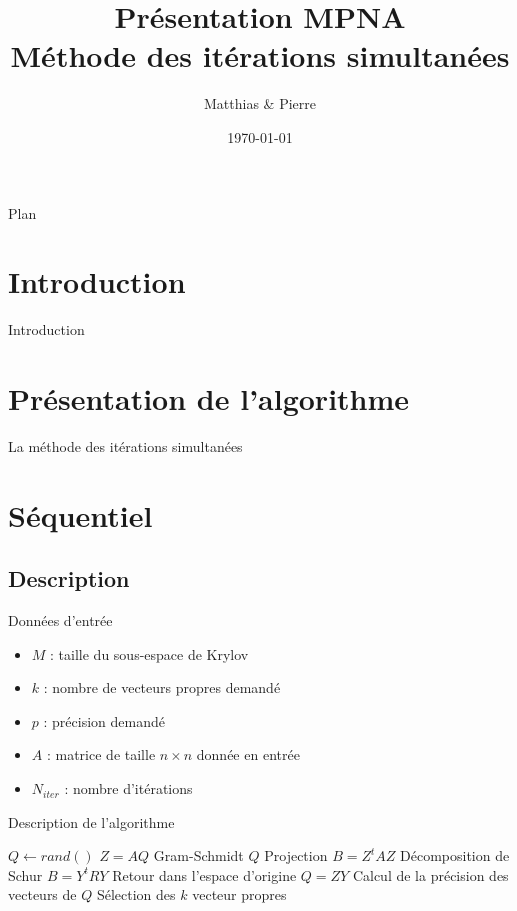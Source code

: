 \documentclass[9.5pt]{beamer}
\title[MPNA : MIS]{Présentation MPNA \\Méthode des itérations simultanées}
\author[\bsc{Beaupère} \& \bsc{Granger}]{Matthias \bsc{Beaupère} \& Pierre \bsc{Granger}}
\institute{M2 CHPS}
\date{\today}
\begin{document}

\begin{frame}
  \titlepage
\end{frame}

\begin{frame}{Plan}
	\tableofcontents[hideallsubsections]
\end{frame}

\section{Introduction}
	\begin{frame}{Introduction}

	\end{frame}

\section{Présentation de l'algorithme}
	\begin{frame}{La méthode des itérations simultanées}

	\end{frame}

\section{Séquentiel}
	\subsection{Description}
		\begin{frame}{Données d'entrée}
			\begin{itemize}
				\item $M$ : taille du sous-espace de Krylov
				\item $k$ : nombre de vecteurs propres demandé
				\item $p$ : précision demandé
				\item $A$ : matrice de taille $n\times n$ donnée en entrée
				\item $N_{iter}$ : nombre d'itérations
			\end{itemize}
		\end{frame}
		\begin{frame}{Description de l'algorithme}
			\begin{algorithmic}
				\State $Q \gets rand()$
					\State $Z = AQ$
					\State Gram-Schmidt $Q$
					\State Projection $B = Z^tAZ$
					\State Décomposition de Schur $B = Y^tRY$
					\State Retour dans l'espace d'origine $Q = ZY$
					\State Calcul de la précision des vecteurs de $Q$
					\State Sélection des $k$ vecteur propres
				\EndWhile
			\end{algorithmic}
		\end{frame}
\end{document}
